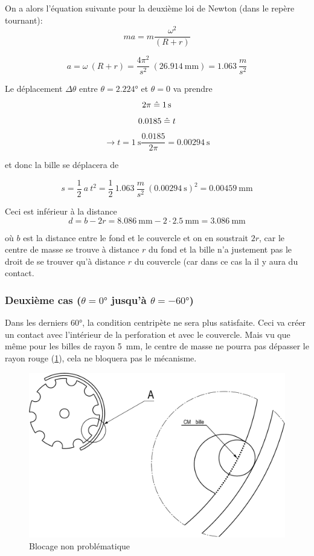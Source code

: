On a alors l'équation suivante pour la deuxième loi de Newton (dans le repère tournant):
\[ma = m \frac{\omega^{2}}{(R + r)}\]

\[a = \omega \ (R + r) = \frac{4 \pi^{2}}{s^{2}} \ (\SI{26.914}{\milli\metre}) = 1.063 \ \frac{m}{s^{2}}\]

Le déplacement $\Delta\theta$ entre $\theta =\ang{2.224}$ et $\theta = 0$ va prendre
\[2 \pi \estimates \SI{1}{\s}\]
\[0.0185 \mathrel{\hat{=}} t \]
\[\rightarrow t = \SI{1}{\s} \frac{0.0185}{2 \pi} = \SI{0.00294}{\second}\]

et donc la bille se déplacera de 

\[s = \frac{1}{2} \ a \ t^{2} = \frac{1}{2} \ 1.063 \ \frac{m}{s^{2}} \ (\SI{0.00294}{\s})^{2} = \SI{0.00459}{\milli\metre}\]

Ceci est inférieur à la distance 
\[d = b - 2r = \SI{8.086}{\milli\metre} - 2 \cdot \SI{2.5}{\milli\metre} = \SI{3.086}{\milli\metre}\]

où $b$ est la distance entre le fond et le couvercle et on en soustrait $2r$, car le centre de masse se trouve à distance $r$ du fond et la bille n'a justement pas le droit de se trouver qu'à distance $r$ du couvercle (car dans ce cas la il y aura du contact.

\subsubsection{Deuxième cas ($\theta = \ang{0}$ jusqu'à $\theta = \ang{-60}$)}
Dans les derniers \ang{60}, la condition centripète ne sera plus satisfaite. Ceci va créer un contact avec l'intérieur de la perforation et avec le couvercle. Mais vu que même pour les billes de rayon \SI{5}{\milli\metre}, le centre de masse ne pourra pas dépasser le rayon rouge (\ref{fig:4.2}), cela ne bloquera pas le mécanisme.

\begin{figure}
    \centering
    \includegraphics[width=\textwidth]{Graphics/Dessins_justification_Leon/DESSIN_BLOQUAGE_IMPROBLEMATIQUE_FAUSSE_COTE.pdf}
    \caption{Blocage non problématique}
    \label{fig:4.2}
\end{figure}

